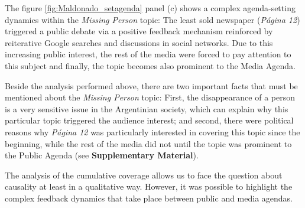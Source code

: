 \documentclass{bmcart}
\begin{document}
\par The figure \ref{fig:Maldonado_setagenda} panel (c) shows a complex agenda-setting dynamics within the \emph{Missing Person} topic: The least sold newspaper (\emph{P\'agina 12}) triggered a public debate  via a positive feedback mechanism reinforced by reiterative Google searches and discussions in social networks. Due to this increasing public interest, the rest of the media were forced to pay attention to this subject and finally, the topic becomes also prominent to the Media Agenda. 


\par Beside the analysis performed above, there are two important facts that must be mentioned about the \emph{Missing Person} topic: First, the disappearance of a person is a very sensitive issue in the Argentinian society, which can explain why this particular topic triggered the audience interest; and second, there were political reasons why \emph{P\'agina 12} was particularly interested in covering this topic since the beginning, while the rest of the media did not until the topic was prominent to the Public Agenda (see \textbf{Supplementary Material}).
\par The analysis of the cumulative coverage allows us to face the question about causality at least in a qualitative way.
However, it was possible to highlight the complex feedback dynamics that take place between public and media agendas.
\end{document}
